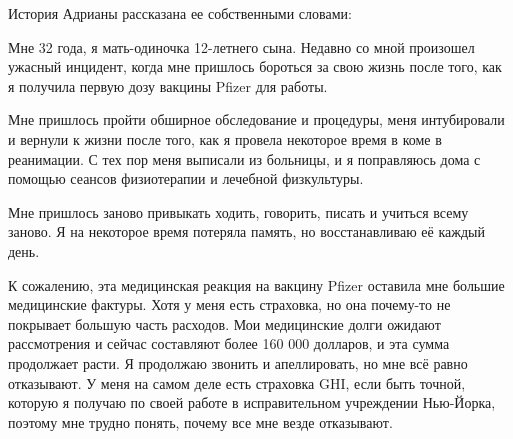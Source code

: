 История Адрианы рассказана ее собственными словами:

Мне 32 года, я мать-одиночка 12-летнего сына. Недавно со мной произошел ужасный
инцидент, когда мне пришлось бороться за свою жизнь после того, как я получила
первую дозу вакцины Pfizer для работы.

Мне пришлось пройти обширное обследование и процедуры, меня интубировали и
вернули к жизни после того, как я провела некоторое время в коме в реанимации. С
тех пор меня выписали из больницы, и я поправляюсь дома с помощью сеансов
физиотерапии и лечебной физкультуры.

Мне пришлось заново привыкать ходить, говорить, писать и учиться всему заново. Я
на некоторое время потеряла память, но восстанавливаю её каждый день.

К сожалению, эта медицинская реакция на вакцину Pfizer оставила мне большие
медицинские фактуры. Хотя у меня есть страховка, но она почему-то не покрывает
большую часть расходов. Мои медицинские долги ожидают рассмотрения и сейчас
составляют более 160 000 долларов, и эта сумма продолжает расти. Я продолжаю
звонить и апеллировать, но мне всё равно отказывают. У меня на самом деле есть
страховка GHI, если быть точной, которую я получаю по своей работе в
исправительном учреждении Нью-Йорка, поэтому мне трудно понять, почему все мне
везде отказывают.
